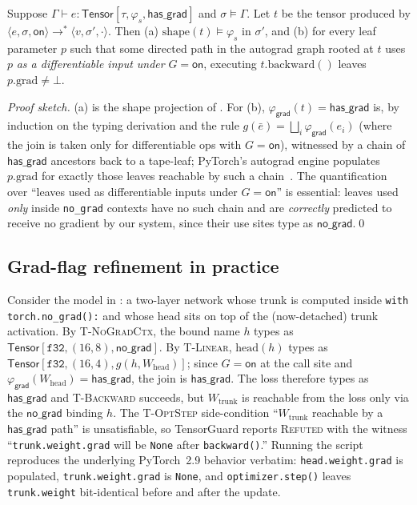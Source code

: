 \begin{theorem}
\label{thm:grad-soundness}
Suppose $\Gamma\vdash e:\mathsf{Tensor}[\tau,\varphi_s,\mathsf{has\_grad}]$
and $\sigma\models\Gamma$. Let $t$ be the tensor produced by
$\langle e,\sigma,\mathsf{on}\rangle\to^*\langle v,\sigma',\cdot\rangle$.
Then (a) $\mathrm{shape}(t)\models\varphi_s$ in $\sigma'$, and
(b) for every leaf parameter $p$ such that some directed path in
the autograd graph rooted at $t$ uses $p$ \emph{as a
differentiable input under} $G=\mathsf{on}$, executing
$t.\mathrm{backward}()$ leaves $p.\mathrm{grad}\neq\bot$.
\end{theorem}
\begin{proof}[Proof sketch]
(a) is the shape projection of . For (b),
$\varphi_{\mathsf{grad}}(t)=\mathsf{has\_grad}$ is, by induction
on the typing derivation and the rule
$g(\bar e)=\bigsqcup_i\varphi_{\mathsf{grad}}(e_i)$ (where the
join is taken only for differentiable ops with $G=\mathsf{on}$),
witnessed by a chain of $\mathsf{has\_grad}$ ancestors back to a
tape-leaf; PyTorch's autograd engine populates
$p.\mathrm{grad}$ for exactly those leaves
reachable by such a chain~\cite{paszke2019pytorch}. The
quantification over ``leaves used as differentiable inputs under
$G=\mathsf{on}$'' is essential: leaves used \emph{only} inside
\texttt{no\_grad} contexts have no such chain and are
\emph{correctly} predicted to receive no gradient by our system,
since their use sites type as $\mathsf{no\_grad}$.\qed
\end{proof}

\subsection{Grad-flag refinement in practice}
\label{sec:rt:gradflag}

Consider the model in
: a
two-layer network whose trunk is computed inside
\texttt{with torch.no\_grad():} and whose head sits on top of
the (now-detached) trunk activation. By
\textsc{T-NoGradCtx}, the bound name $h$ types as
$\mathsf{Tensor}[\mathtt{f32},(16,8),\mathsf{no\_grad}]$. By
\textsc{T-Linear}, $\mathrm{head}(h)$ types as
$\mathsf{Tensor}[\mathtt{f32},(16,4),g(h,W_{\mathrm{head}})]$;
since $G=\mathsf{on}$ at the call site and
$\varphi_{\mathsf{grad}}(W_{\mathrm{head}})=\mathsf{has\_grad}$,
the join is $\mathsf{has\_grad}$. The loss therefore types as
$\mathsf{has\_grad}$ and \textsc{T-Backward} succeeds, but
$W_{\mathrm{trunk}}$ is reachable from the loss only via the
$\mathsf{no\_grad}$ binding $h$. The
\textsc{T-OptStep} side-condition
``$W_{\mathrm{trunk}}$ reachable by a $\mathsf{has\_grad}$ path''
is unsatisfiable, so TensorGuard reports
\textsc{Refuted} with the witness ``\texttt{trunk.weight.grad}
will be \texttt{None} after \texttt{backward()}.'' Running the
script reproduces the underlying PyTorch~2.9 behavior verbatim:
\texttt{head.weight.grad} is populated,
\texttt{trunk.weight.grad} is \texttt{None}, and
\texttt{optimizer.step()} leaves \texttt{trunk.weight}
bit-identical before and after the update.

